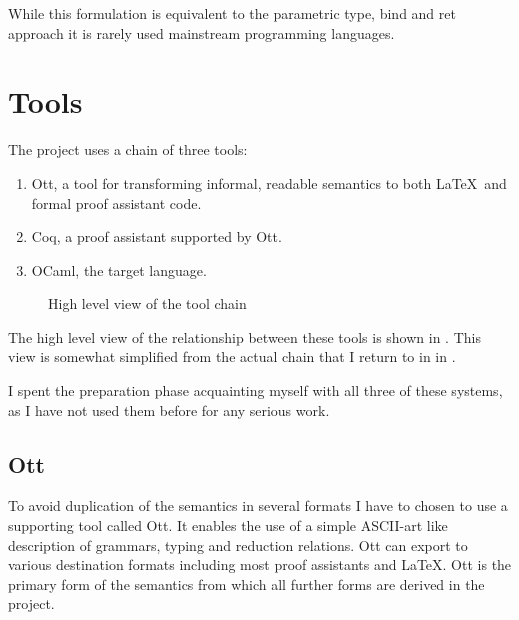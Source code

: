 \documentclass[12pt,twoside,notitlepage]{report}
\theoremstyle{plain}%
\theoremstyle{definition}
\theoremstyle{remark}
\begin{document}
While this formulation is equivalent to the parametric type, bind and ret approach it is rarely used mainstream programming languages.

\section{Tools}
The project uses a chain of three tools: \begin{enumerate}
\item{
Ott, a tool for transforming informal, readable semantics to both \LaTeX\, and formal proof assistant code.}
\item{Coq, a proof assistant supported by Ott. }
\item{OCaml, the target language. }
\end{enumerate}

\begin{figure}[h!]
\centering
{}
\caption{High level view of the tool chain}
\label{fig:simpl_toolchain}
\end{figure}

The high level view of the relationship between these tools is shown in . This view is somewhat simplified from the actual chain that I return to in  in .

I spent the preparation phase acquainting myself with all three of these systems, as I have not used them before for any serious work.
\subsection{Ott}
To avoid duplication of the semantics in several formats I have to chosen to use a supporting tool called Ott\cite{Ott}. It enables the use of a simple ASCII-art like description of grammars, typing and reduction relations. Ott can export to various destination formats including most proof assistants and \LaTeX. Ott  is the primary form of the semantics from which all further forms are derived in the project.
\end{document}
